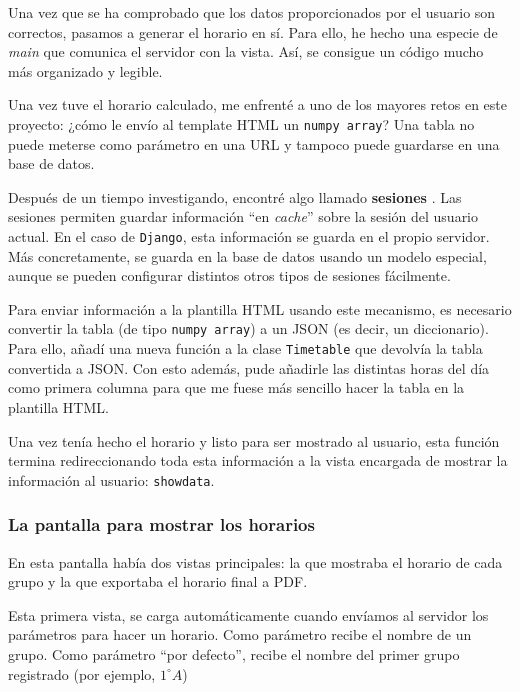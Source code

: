 Una vez que se ha comprobado que los datos proporcionados por el usuario son correctos, pasamos a generar el horario en sí. Para ello, he hecho una especie de \textit{main} que comunica el servidor con la vista. Así, se consigue un código mucho más organizado y legible.

Una vez tuve el horario calculado, me enfrenté a uno de los mayores retos en este proyecto: ¿cómo le envío al template HTML un \texttt{numpy array}? Una tabla no puede meterse como parámetro en una URL y tampoco puede guardarse en una base de datos. 

Después de un tiempo investigando, encontré algo llamado \textbf{sesiones} \cite{sessions}. Las sesiones permiten guardar información ``en \textit{cache}'' sobre la sesión del usuario actual. En el caso de \texttt{Django}, esta información se guarda en el propio servidor. Más concretamente, se guarda en la base de datos usando un modelo especial, aunque se pueden configurar distintos otros tipos de sesiones fácilmente.

Para enviar información a la plantilla HTML usando este mecanismo, es necesario convertir la tabla (de tipo \texttt{numpy array}) a un JSON (es decir, un diccionario). Para ello, añadí una nueva función a la clase \texttt{Timetable} que devolvía la tabla convertida a JSON. Con esto además, pude añadirle las distintas horas del día como primera columna para que me fuese más sencillo hacer la tabla en la plantilla HTML.

Una vez tenía hecho el horario y listo para ser mostrado al usuario, esta función termina redireccionando toda esta información a la vista encargada de mostrar la información al usuario: \texttt{showdata}.

\subsubsection{La pantalla para mostrar los horarios}
En esta pantalla había dos vistas principales: la que mostraba el horario de cada grupo y la que exportaba el horario final a PDF.

Esta primera vista, se carga automáticamente cuando envíamos al servidor los parámetros para hacer un horario. Como parámetro recibe el nombre de un grupo. Como parámetro ``por defecto'', recibe el nombre del primer grupo registrado (por ejemplo, $1^{\circ} A$)
